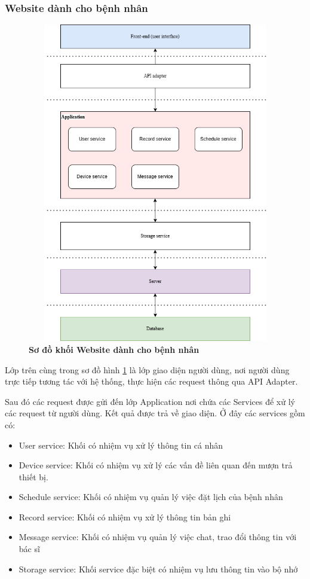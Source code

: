 \subsubsection{Website dành cho bệnh nhân}
\begin{figure}[H]
  \centering
  \includegraphics[width=12cm,height=14cm]{Images/System/fmECG_architecture-Patient.drawio.png}
  \caption[Sơ đồ khối Website dành cho bệnh nhân]{\bfseries \fontsize{12pt}{0pt}\selectfont Sơ đồ khối Website dành cho bệnh nhân}
  \label{fmECG_architecture-Patient} %
\end{figure}
Lớp trên cùng trong sơ đồ hình \ref{fmECG_architecture-Patient} là lớp giao diện người dùng,
nơi người dùng trực tiếp tương tác với hệ thống, thực hiện các request thông qua API Adapter.

Sau đó các request được gửi đến lớp Application nơi chứa các Services để xử lý các request từ người dùng. 
Kết quả được trả về giao diện. Ở đây các services gồm có: 

\begin{adjustwidth}{1.5em}{}
  \begin{itemize}
    \item User service: Khối có nhiệm vụ xử lý thông tin cá nhân
    \item Device service: Khối có nhiệm vụ xử lý các vấn đề liên quan đến mượn trả thiết bị.
    \item Schedule service: Khối có nhiệm vụ quản lý việc đặt lịch của bệnh nhân
    \item Record service: Khối có nhiệm vụ xử lý thông tin bản ghi
    \item Message service: Khối có nhiệm vụ quản lý việc chat, trao đổi thông tin với bác sĩ
    \item Storage service: Khối service đặc biệt có nhiệm vụ lưu thông tin vào bộ nhớ
  \end{itemize}
\end{adjustwidth}


